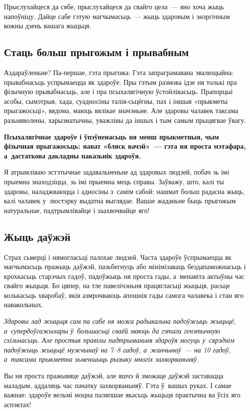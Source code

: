 Прыслухайцеся да сябе, прыслухайцеся да свайго цела~--- яно хоча жыць напоўніцу. Дайце сабе гэтую магчымасьць~--- жыць здаровым і энэргічным кожны дзень вашага жыцьця.

\subsection*{Стаць больш прыгожым і прывабным}

Аздараўленьне? Па-першае, гэта прыгожа. Гэта запраграмавана эвалюцыйна: прывабнасьць успрымаецца як здароўе. Пры гэтым размова ідзе ня толькі пра фізычную прывабнасьць, але і пра псыхалягічную ўстойлівасьць. Прапорцыі асобы, сымэтрыя, хада, суадносіны талія-сьцёгны, пах і іншыя «прыкметы прыгажосьці», вядома, маюць вялікае значэньне. Але здаровы чалавек таксама разьняволены, харызматычны, уважлівы да іншых і тым самым прыцягвае ўвагу.

\textbf{Псыхалягічнае здароўе і ўпэўненасьць ня менш прыкметныя, чым фізычная прыгажосьць: нават «бляск вачэй»~--- гэта ня проста мэтафара, а~дастаткова дакладны паказьнік здароўя.}

Я атрымліваю эстэтычнае задавальненьне ад здаровых людзей, побач зь імі прыемна знаходзіцца, зь імі прыемна мець справы. Заўважу, што, калі ты здаровы, наладжваюцца і адносіны з~самім сабой: нашмат больш радасна жыць, калі чалавек у~люстэрку выдатна выглядае. Вашае жаданьне быць прыгожым натуральнае, падтрымлівайце і заахвочвайце яго!

\subsection*{Жыць даўжэй}

Страх сьмерці і нямогласьці палохае людзей. Часта здароўе ўспрымаецца як магчымасьць пражыць даўжэй, пазьбегнуць або мінімізаваць бездапаможнасьць і крохкасьць старэчых гадоў, падоўжыць ня проста гады, а~менавіта актыўны час свайго жыцьця. Бо цяпер, на тле павелічэньня працягласьці жыцьця, расьце колькасьць хваробаў, якія азмрочваюць апошнія гады самога чалавека і стан яго навакольных.

\emph{Здаровы лад жыцьця сам па сабе ня можа радыкальна падоўжыць жыцьцё, а~супердоўгажыхары ў~большасьці сваёй маюць да гэтага генэтычную схільнасьць. Але простыя правілы падтрыманьня здароўя могуць у~сярэднім падоўжыць жыцьцё мужчынаў на 7--8 гадоў, а~жанчынаў~--- на 10 гадоў, а~таксама прыкметна зьменшыць рызыку многіх захворваньняў.}

Вы ня проста пражывяце даўжэй, але яшчэ й зможаце даўжэй заставацца маладым, аддаляць час пачатку захворваньняў. Гэта ў~вашых руках. І самае важнае: здароўе вельмі моцна паляпшае якасьць жыцьця практычна ва ўсіх яго аспэктах!

